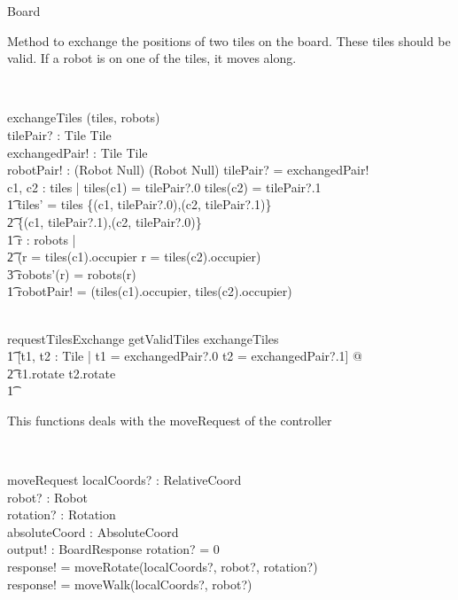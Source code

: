 \documentclass[12pt]{article}
\begin{document}
\begin{class}{Board}
\begin{classcom}
Method to exchange the positions of two tiles on the board. These tiles should be valid. If a robot is on one of the tiles, it moves along.
\end{classcom} \\
\begin{schema}{exchangeTiles}
\Delta(tiles, robots) \\
tilePair? : Tile \cross Tile \\
exchangedPair! : Tile \cross Tile \\
robotPair! : (Robot \cup Null) \cross (Robot \cup Null)
\where
tilePair? = exchangedPair! \\
\also \also \also
\exists c1, c2 : \dom tiles | tiles(c1) = tilePair?.0 \wedge tiles(c2) = tilePair?.1 \; \; \wedge \\ \t1
tiles' = tiles \setminus \{(c1, tilePair?.0),(c2, tilePair?.1)\} \cup \\ \t2 \{(c1, tilePair?.1),(c2, tilePair?.0)\}
\\ \t1 \forall r : \dom robots | \\ \t2 (r \not = tiles(c1).occupier \wedge r \not = tiles(c2).occupier) \Rightarrow \\ \t3 robots'(r) = robots(r) \\ \t1
robotPair! = (tiles(c1).occupier, tiles(c2).occupier)
\end{schema} \\
requestTilesExchange \sdef getValidTiles \comp exchangeTiles \; \; \comp \\
\t1 [t1, t2 : Tile | t1 = exchangedPair?.0 \wedge t2 = exchangedPair?.1] @ \\ \t2 t1.rotate \wedge t2.rotate \\ \t1
\znewpage
\begin{classcom}
This functions deals with the moveRequest of the controller
\end{classcom} \\
\begin{schema}{moveRequest}
localCoords? : RelativeCoord \\
robot? : Robot \\
rotation? : Rotation \\
absoluteCoord : AbsoluteCoord \\
output! : BoardResponse
\where
\IF rotation? \not = 0 \\
\THEN response! = moveRotate(localCoords?, robot?, rotation?) \\
\ELSE response! = moveWalk(localCoords?, robot?)
\end{schema} \\

\end{class}
\end{document}
